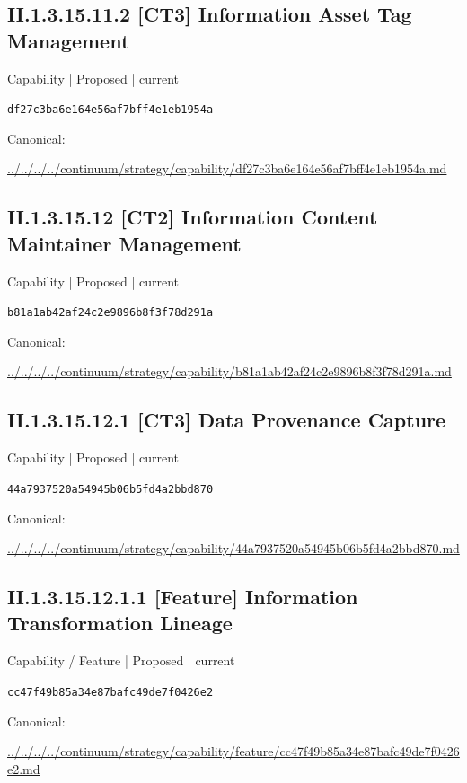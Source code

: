\documentclass[10pt,a4paper]{article}
\begin{document}
\subsection*{II.1.3.15.11.2 [CT3] Information Asset Tag Management}
{\small Capability | Proposed | current}\par
\texttt{df27c3ba6e164e56af7bff4e1eb1954a}\par
Canonical: \par
{\footnotesize\url{../../../../continuum/strategy/capability/df27c3ba6e164e56af7bff4e1eb1954a.md}}\par
\subsection*{II.1.3.15.12 [CT2] Information Content Maintainer Management}
{\small Capability | Proposed | current}\par
\texttt{b81a1ab42af24c2e9896b8f3f78d291a}\par
Canonical: \par
{\footnotesize\url{../../../../continuum/strategy/capability/b81a1ab42af24c2e9896b8f3f78d291a.md}}\par
\subsection*{II.1.3.15.12.1 [CT3] Data Provenance Capture}
{\small Capability | Proposed | current}\par
\texttt{44a7937520a54945b06b5fd4a2bbd870}\par
Canonical: \par
{\footnotesize\url{../../../../continuum/strategy/capability/44a7937520a54945b06b5fd4a2bbd870.md}}\par
\subsection*{II.1.3.15.12.1.1 [Feature] Information Transformation Lineage}
{\small Capability / Feature | Proposed | current}\par
\texttt{cc47f49b85a34e87bafc49de7f0426e2}\par
Canonical: \par
{\footnotesize\url{../../../../continuum/strategy/capability/feature/cc47f49b85a34e87bafc49de7f0426e2.md}}\par
\end{document}
